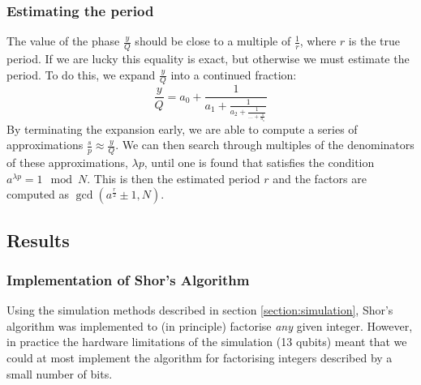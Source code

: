 \documentclass{article}[11pt]
\begin{document}
\subsubsection{Estimating the period}
The value of the phase $\frac{y}{Q}$ should be close to a multiple of $\frac{1}{r}$, where $r$ is the true period. If we are lucky this equality is exact, but otherwise we must estimate the period. To do this, we expand $\frac{y}{Q}$ into a continued fraction:
\begin{equation}
\frac{y}{Q}=a_0+\frac{1}{a_1+\frac{1}{a_2+\frac{1}{\dots+\frac{1}{a_n}}}}
\end{equation}
By terminating the expansion early, we are able to compute a series of approximations $\frac{s}{p}\approx\frac{y}{Q}$. We can then search through multiples of the denominators of these approximations, $\lambda p$, until one is found that satisfies the condition $a^{\lambda p} = 1\mod{N}$. This is then the estimated period $r$ and the factors are computed as $\gcd(a^{\frac{r}{2}}\pm 1,N)$.


\subsection{Results}
\subsubsection{Implementation of Shor's Algorithm}
Using the simulation methods described in section \ref{section:simulation}, Shor's algorithm was implemented to (in principle) factorise \emph{any} given integer. However, in practice the hardware limitations of the simulation (13 qubits) meant that we could at most implement the algorithm for factorising integers described by a small number of bits.
\end{document}
